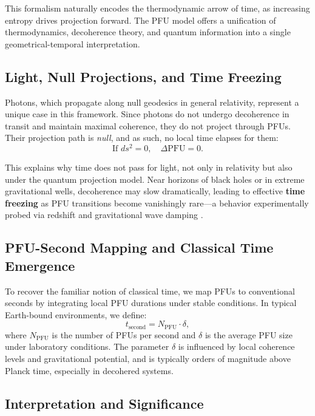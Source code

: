 \documentclass[12pt,a4paper]{article}
\numberwithin{equation}{section}
\begin{document}
This formalism naturally encodes the thermodynamic arrow of time, as increasing entropy drives projection forward. The PFU model offers a unification of thermodynamics, decoherence theory, and quantum information into a single geometrical-temporal interpretation.

\subsection{Light, Null Projections, and Time Freezing}

Photons, which propagate along null geodesics in general relativity, represent a unique case in this framework. Since photons do not undergo decoherence in transit and maintain maximal coherence, they do not project through PFUs. Their projection path is \emph{null}, and as such, no local time elapses for them:
\begin{equation}
\label{eq:null_pfu}
\text{If } ds^2 = 0, \quad \Delta \mathrm{PFU} = 0.
\end{equation}

This explains why time does not pass for light, not only in relativity but also under the quantum projection model. Near horizons of black holes or in extreme gravitational wells, decoherence may slow dramatically, leading to effective \textbf{time freezing} as PFU transitions become vanishingly rare—a behavior experimentally probed via redshift and gravitational wave damping \cite{schutz_gravitation_2009}.

\subsection{PFU-Second Mapping and Classical Time Emergence}

To recover the familiar notion of classical time, we map PFUs to conventional seconds by integrating local PFU durations under stable conditions. In typical Earth-bound environments, we define:
\begin{equation}
\label{eq:pfu_to_seconds}
t_{\text{second}} = N_{\text{PFU}} \cdot \delta,
\end{equation}
where $N_{\text{PFU}}$ is the number of PFUs per second and $\delta$ is the average PFU size under laboratory conditions. The parameter $\delta$ is influenced by local coherence levels and gravitational potential, and is typically orders of magnitude above Planck time, especially in decohered systems.

\subsection{Interpretation and Significance}
\end{document}
